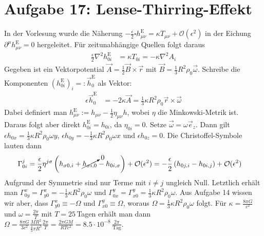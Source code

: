 \documentclass[a4paper,12pt]{article}
\newcommand{\kla}{}
\newcommand{\tecxt}{}
\begin{document}
\section*{Aufgabe 17: Lense-Thirring-Effekt}
In der Vorlesung wurde die Näherung $-\frac{\epsilon}{2}\square h_{\mu\nu}^\tecxt\text{E}=\kappa T_{\mu\nu}+\mathcal{O}(\epsilon^2)$ in der Eichung $\partial^\mu h_{\mu\nu}^\tecxt\text{E}=0$ hergeleitet. Für zeitunabhängige Quellen folgt daraus
\begin{align*}
\frac{\epsilon}{2}\nabla^2h_{0i}^\tecxt\text{E}&=\kappa T_{0i}=-\kappa\nabla^2A_i
\end{align*}
Gegeben ist ein Vektorpotential $\vec{A}=\frac{1}{2}\vec{B}\times\vec{r}$ mit $\vec{B}=\frac{1}{3}R^2\rho_0\vec{\omega}$. Schreibe die Komponenten $(h_{0i}^\tecxt\text{E})_i=:\vec{h}_0^\tecxt\text{E}$ als Vektor:
\begin{align*}
\epsilon \vec{h}_{0}^\tecxt\text{E}&=-2\kappa \vec{A}=\frac{1}{3}\kappa R^2\rho_0\vec{r}\times\vec{\omega}
\end{align*}
Dabei definiert man $h_{\mu\nu}^\tecxt\text{E}:=h_{\mu\nu}-\frac{1}{2}\eta_{\mu\nu}h$, wobei $\eta$ die Minkowski-Metrik ist. Daraus folgt aber direkt $h_{0i}^\tecxt\text{E}=h_{0i}$, da $\eta_{0i}=0$. Setze $\vec{\omega}=\omega\vec{e}_z$. Dann gilt $\epsilon h_{0x}=\frac{1}{3}\kappa R^2\rho_0\omega y$, $\epsilon h_{0y}=-\frac{1}{3}\kappa R^2\rho_0\omega x$ und $\epsilon h_{0z}=0$. Die Christoffel-Symbole lauten dann
\begin{align*}
\Gamma^j_{0i}&=\frac{\epsilon}{2}\eta^{j\sigma}\kla\left( {h_{\sigma 0,i}+\cancelto{0}{h_{\sigma i,0}}-h_{0i,\sigma}} \right)+\mathcal{O}(\epsilon^2)=-\frac{\epsilon}{2}\kla\left( {h_{0j,i}-h_{0i,j}} \right)+\mathcal{O}(\epsilon^2)
\end{align*}
Aufgrund der Symmetrie sind nur Terme mit $i\neq j$ ungleich Null. Letztlich erhält man $\Gamma^x_{0y}=\Gamma^x_{y0}=-\frac{1}{3}\kappa R^2\rho_0\omega$ und $\Gamma^y_{0x}=\Gamma^y_{x0}=\frac{1}{3}\kappa R^2\rho_0\omega$. Aus Aufgabe 14 wissen wir aber, dass $\Gamma^x_{y0}\equiv -\Omega$ und $\Gamma^y_{x0}\equiv\Omega$, woraus $\Omega=\frac{1}{3}\kappa R^2\rho_0\omega$ folgt. Für $\kappa =\frac{8\pi G}{c^2}$ und $\omega=\frac{2\pi}{T}$ mit $T=25\,$Tagen erhält man dann $\Omega=\frac{8\pi G}{3c^2}\frac{MR^2}{\frac{4}{3}\pi R^3}\frac{2\pi}{T}=\frac{2\pi GM}{RTc^2}=8.5\cdot 10^{-8}\,\frac{2\pi}{\tecxt\text{Tag}}$.
\end{document}
